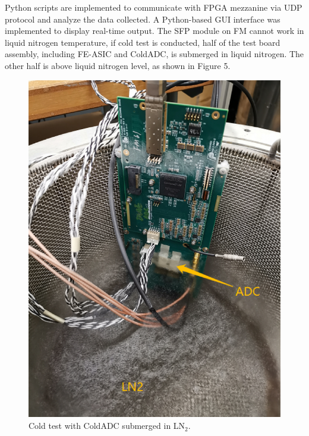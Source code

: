 Python scripts are implemented to communicate with FPGA mezzanine via UDP protocol and analyze the data collected. A Python-based GUI interface was implemented to display real-time output.
The SFP module on FM cannot work in liquid nitrogen temperature, if cold test is conducted, half of the test board assembly, including FE-ASIC and ColdADC, is submerged in liquid nitrogen. The other half is above liquid nitrogen level, as shown in Figure 5.    
\begin{figure}[!ht]
\centering
 \includegraphics[width=0.5\linewidth]{figures/BNL_coldtest.png}
  \caption{Cold test with ColdADC submerged in LN$_2$.}
  \label{fig:bnl_coldtest}
\end{figure}
